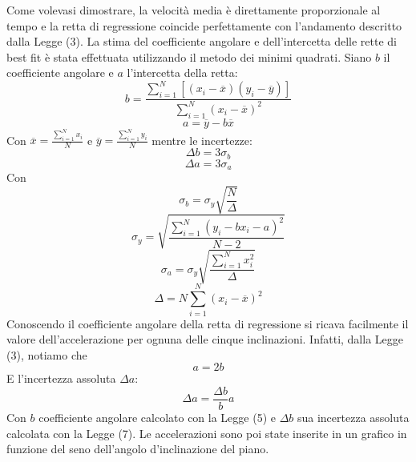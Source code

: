 \documentclass[11pt]{article}
\begin{document}
Come volevasi dimostrare, la velocità media è direttamente proporzionale al tempo e la retta di regressione coincide perfettamente con l'andamento descritto dalla Legge (3). La stima del coefficiente angolare e dell'intercetta delle rette di best fit è stata effettuata utilizzando il metodo dei minimi quadrati.
Siano $b$ il coefficiente angolare e $a$ l'intercetta della retta:
\begin{equation}
    b=\frac{\displaystyle\sum_{i=1}^{N}[(x_i-\overline{x})(y_i-\overline{y})]}{\displaystyle\sum_{i=1}^{N}(x_i-\overline{x})^2}
\end{equation}
\begin{equation}
    a=\overline{y}-b\overline{x}
\end{equation}
Con $\overline{x}=\frac{\displaystyle\sum_{i=1}^{N}x_i}{N}$ e $\overline{y}=\frac{\displaystyle\sum_{i=1}^{N}y_i}{N}$
mentre le incertezze:
\begin{equation}
    \Delta b=3\sigma_b
\end{equation}
\begin{equation}
    \Delta a=3\sigma_a
\end{equation}
Con
\begin{equation}
    \sigma_b=\sigma_y\sqrt{\frac{N}{\Delta}}
\end{equation}
\begin{equation}
    \sigma_y=\sqrt{\frac{\displaystyle\sum_{i=1}^{N}(y_i-bx_i-a)^2}{N-2}}
\end{equation}
\begin{equation}
    \sigma_a=\sigma_y\sqrt{\frac{\displaystyle\sum_{i=1}^{N}x_i^2}{\Delta}}
\end{equation}
\begin{equation}
    \Delta=N\displaystyle\sum_{i=1}^{N}(x_i-\overline{x})^2
\end{equation}
Conoscendo il coefficiente angolare della retta di regressione si ricava facilmente il valore dell'accelerazione per ognuna delle cinque inclinazioni. Infatti, dalla Legge (3), notiamo che 
\begin{equation}
    a = 2b
\end{equation}
E l'incertezza assoluta $\Delta a$:
\begin{equation}
    \Delta a=\frac{\Delta b}{b}a
\end{equation}
Con $b$ coefficiente angolare calcolato con la Legge (5) e $\Delta b$ sua incertezza assoluta calcolata con la Legge (7).
Le accelerazioni sono poi state inserite in un grafico in funzione del seno dell'angolo d'inclinazione del piano.
\end{document}
